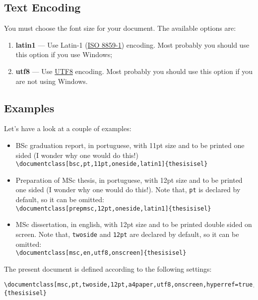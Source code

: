\subsection{Text Encoding} %
\label{ssec:text_encoding}

You must choose the font size for your document. The available options are:
\begin{enumerate}
	\item \textbf{latin1} --- Use Latin-1 (\href{http://en.wikipedia.org/wiki/ISO/IEC_8859-1}{ISO 8859-1}) encoding.  Most probably you should use this option if you use Windows;
	\item \textbf{utf8} --- Use \href{http://en.wikipedia.org/wiki/UTF-8}{UTF8} encoding.    Most probably you should use this option if you are not using Windows.
\end{enumerate}

\subsection{Examples} %
\label{ssec:examples}

Let's have a look at a couple of examples:

\begin{itemize}
	\item BSc graduation report, in portuguese, with 11pt size and to be printed one sided (I wonder why one would do this!)\\
	\verb!\documentclass[bsc,pt,11pt,oneside,latin1]{thesisisel}!
	\item Preparation of MSc thesis, in portuguese, with 12pt size and to be printed one sided (I wonder why one would do this!). Note that, \verb!pt! is declared by default, so it can be omitted: \\
	\verb!\documentclass[prepmsc,12pt,oneside,latin1]{thesisisel}!
	\item MSc dissertation, in english, with 12pt size and to be printed double sided on screen. Note that, \verb!twoside! and \verb!12pt! are declared by default, so it can be omitted: \\
	\verb!\documentclass[msc,en,utf8,onscreen]{thesisisel}!
\end{itemize}


The present document is defined according to the following settings:
\begin{Verbatim}[breaklines=true, breakanywhere=true]
\documentclass[msc,pt,twoside,12pt,a4paper,utf8,onscreen,hyperref=true,listof=totoc] {thesisisel}
\end{Verbatim}

